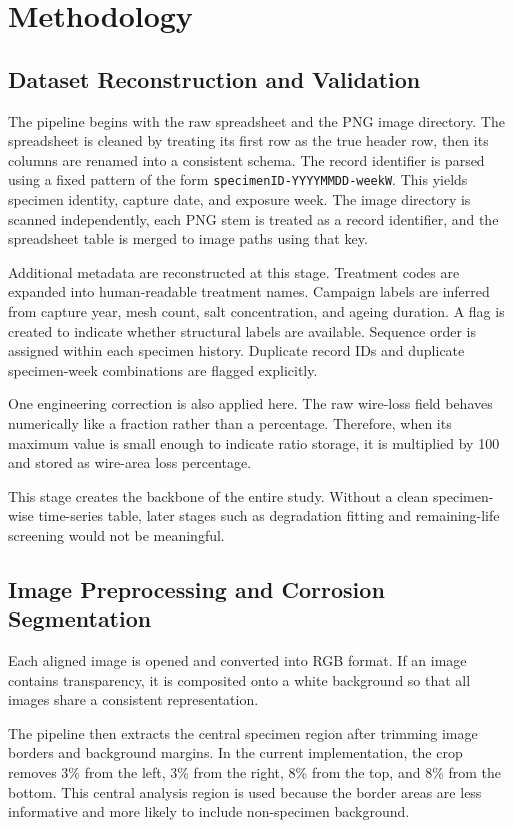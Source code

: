 \documentclass[conference]{IEEEtran}
\begin{document}
\section{Methodology}
\subsection{Dataset Reconstruction and Validation}
The pipeline begins with the raw spreadsheet and the PNG image directory. The spreadsheet is cleaned by treating its first row as the true header row, then its columns are renamed into a consistent schema. The record identifier is parsed using a fixed pattern of the form \texttt{specimenID-YYYYMMDD-weekW}. This yields specimen identity, capture date, and exposure week. The image directory is scanned independently, each PNG stem is treated as a record identifier, and the spreadsheet table is merged to image paths using that key.

Additional metadata are reconstructed at this stage. Treatment codes are expanded into human-readable treatment names. Campaign labels are inferred from capture year, mesh count, salt concentration, and ageing duration. A flag is created to indicate whether structural labels are available. Sequence order is assigned within each specimen history. Duplicate record IDs and duplicate specimen-week combinations are flagged explicitly.

One engineering correction is also applied here. The raw wire-loss field behaves numerically like a fraction rather than a percentage. Therefore, when its maximum value is small enough to indicate ratio storage, it is multiplied by 100 and stored as wire-area loss percentage.

This stage creates the backbone of the entire study. Without a clean specimen-wise time-series table, later stages such as degradation fitting and remaining-life screening would not be meaningful.

\subsection{Image Preprocessing and Corrosion Segmentation}
Each aligned image is opened and converted into RGB format. If an image contains transparency, it is composited onto a white background so that all images share a consistent representation.

The pipeline then extracts the central specimen region after trimming image borders and background margins. In the current implementation, the crop removes 3\% from the left, 3\% from the right, 8\% from the top, and 8\% from the bottom. This central analysis region is used because the border areas are less informative and more likely to include non-specimen background.
\end{document}
